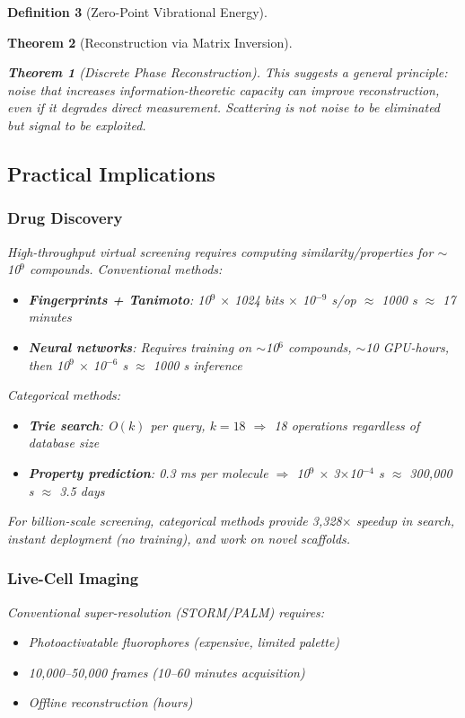 \documentclass[11pt,a4paper]{article}
\newtheorem{theorem}{Theorem}[section]
\theoremstyle{definition}
\newtheorem{definition}[theorem]{Definition}
\theoremstyle{remark}
\begin{document}
\begin{definition}[Zero-Point Vibrational Energy]
\begin{theorem}[Reconstruction via Matrix Inversion]
\begin{theorem}[Discrete Phase Reconstruction]
This suggests a general principle: \textit{noise that increases information-theoretic capacity can improve reconstruction, even if it degrades direct measurement}. Scattering is not noise to be eliminated but signal to be exploited.

\subsection{Practical Implications}

\subsubsection{Drug Discovery}

High-throughput virtual screening requires computing similarity/properties for $\sim$10$^9$ compounds. Conventional methods:
\begin{itemize}
\item \textbf{Fingerprints + Tanimoto}: 10$^9$ $\times$ 1024 bits $\times$ 10$^{-9}$ s/op $\approx$ 1000 s $\approx$ 17 minutes
\item \textbf{Neural networks}: Requires training on $\sim$10$^6$ compounds, $\sim$10 GPU-hours, then 10$^9$ $\times$ 10$^{-6}$ s $\approx$ 1000 s inference
\end{itemize}

Categorical methods:
\begin{itemize}
\item \textbf{Trie search}: O$(k)$ per query, $k=18$ $\Rightarrow$ 18 operations regardless of database size
\item \textbf{Property prediction}: 0.3 ms per molecule $\Rightarrow$ 10$^9$ $\times$ 3$\times$10$^{-4}$ s $\approx$ 300,000 s $\approx$ 3.5 days
\end{itemize}

For billion-scale screening, categorical methods provide 3,328$\times$ speedup in search, instant deployment (no training), and work on novel scaffolds.

\subsubsection{Live-Cell Imaging}

Conventional super-resolution (STORM/PALM) requires:
\begin{itemize}
\item Photoactivatable fluorophores (expensive, limited palette)
\item 10,000--50,000 frames (10--60 minutes acquisition)
\item Offline reconstruction (hours)
\end{itemize}


\end{theorem}
\end{theorem}
\end{definition}
\end{document}
